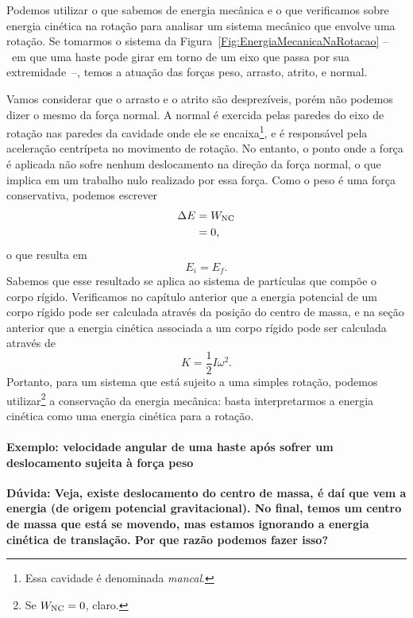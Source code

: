 Podemos utilizar o que sabemos de energia mecânica e o que verificamos sobre energia cinética na rotação para analisar um sistema mecânico que envolve uma rotação. Se tomarmos o sistema da Figura~\ref{Fig:EnergiaMecanicaNaRotacao} --~em que uma haste pode girar em torno de um eixo que passa por sua extremidade~--, temos a atuação das forças peso, arrasto, atrito, e normal.

Vamos considerar que o arrasto e o atrito são desprezíveis, porém não podemos dizer o mesmo da força normal. A normal é exercida pelas paredes do eixo de rotação nas paredes da cavidade onde ele se encaixa\footnote{Essa cavidade é denominada \emph{mancal}.}, e é responsável pela aceleração centrípeta no movimento de rotação. No entanto, o ponto onde a força é aplicada não sofre nenhum deslocamento na direção da força normal, o que implica em um trabalho nulo realizado por essa força. Como o peso é uma força conservativa, podemos escrever
\begin{align}
    \Delta E &= W_{\rm{NC}} \\
    &= 0,
\end{align}
%
o que resulta em
\begin{equation}
    E_i = E_f.
\end{equation}
%
Sabemos que esse resultado se aplica ao sistema de partículas que compõe o corpo rígido. Verificamos no capítulo anterior que a energia potencial de um corpo rígido pode ser calculada através da posição do centro de massa, e na seção anterior que a energia cinética associada a um corpo rígido pode ser calculada através de 
\begin{equation}
    K = \frac{1}{2} I\omega^2.
\end{equation}
%
Portanto, para um sistema que está sujeito a uma simples rotação, podemos utilizar\footnote{Se $W_{\rm{NC}} = 0$, claro.} a conservação da energia mecânica: basta interpretarmos a energia cinética como uma energia cinética para a rotação.

\paragraph{Exemplo: velocidade angular de uma haste após sofrer um deslocamento sujeita à força peso}

\textbf{Dúvida: Veja, existe deslocamento do centro de massa, é daí que vem a energia (de origem potencial gravitacional). No final, temos um centro de massa que está se movendo, mas estamos ignorando a energia cinética de translação. Por que razão podemos fazer isso?}

